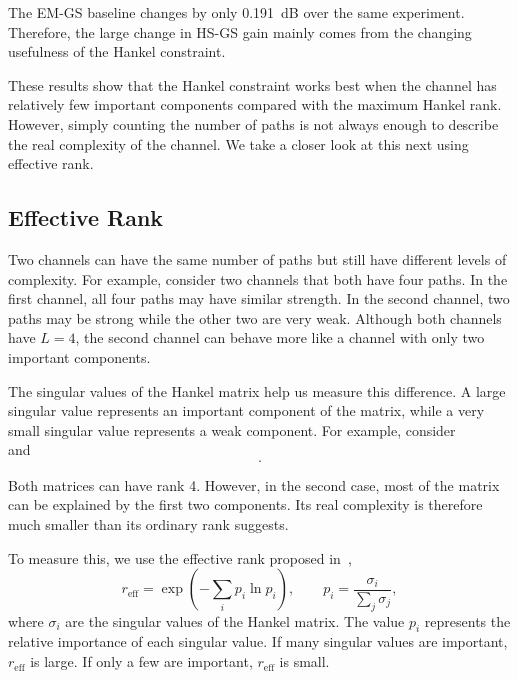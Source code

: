 \documentclass[journal]{IEEEtran}
\newcommand{\reff}{r_{\mathrm{eff}}}
\begin{document}
The EM-GS baseline changes by only 0.191~dB over the same experiment.
Therefore, the large change in HS-GS gain mainly comes from the changing
usefulness of the Hankel constraint.

These results show that the Hankel constraint works best when the channel has
relatively few important components compared with the maximum Hankel rank.
However, simply counting the number of paths is not always enough to describe
the real complexity of the channel. We take a closer look at this next using
effective rank.

\subsection{Effective Rank}

Two channels can have the same number of paths but still have different levels
of complexity. For example, consider two channels that both have four paths. In
the first channel, all four paths may have similar strength. In the second
channel, two paths may be strong while the other two are very weak. Although
both channels have $L=4$, the second channel can behave more like a channel
with only two important components.

The singular values of the Hankel matrix help us measure this difference. A
large singular value represents an important component of the matrix, while a
very small singular value represents a weak component. For example, consider
\begin{equation}
[10,\ 9,\ 8,\ 7]
\end{equation}
and
\begin{equation}
[10,\ 8,\ 0.2,\ 0.1].
\end{equation}

Both matrices can have rank 4. However, in the second case, most of the matrix
can be explained by the first two components. Its real complexity is therefore
much smaller than its ordinary rank suggests.

To measure this, we use the effective rank proposed in~\cite{royvetterli2007},
\begin{equation}
\reff=\exp\left(-\sum_i p_i\ln p_i\right),\qquad
p_i=\frac{\sigma_i}{\sum_j\sigma_j},
\end{equation}
where $\sigma_i$ are the singular values of the Hankel matrix. The value $p_i$
represents the relative importance of each singular value. If many singular
values are important, $\reff$ is large. If only a few are important, $\reff$ is
small.
\end{document}
